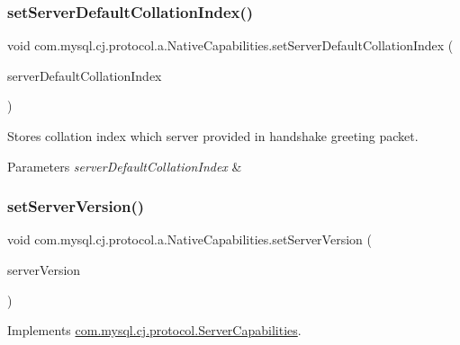\subsubsection{\texorpdfstring{set\+Server\+Default\+Collation\+Index()}{setServerDefaultCollationIndex()}}
{\footnotesize\ttfamily void com.\+mysql.\+cj.\+protocol.\+a.\+Native\+Capabilities.\+set\+Server\+Default\+Collation\+Index (\begin{DoxyParamCaption}\item[{int}]{server\+Default\+Collation\+Index }\end{DoxyParamCaption})}

Stores collation index which server provided in handshake greeting packet.


\begin{DoxyParams}{Parameters}
{\em server\+Default\+Collation\+Index} & \\
\hline
\end{DoxyParams}
\mbox{\label{classcom_1_1mysql_1_1cj_1_1protocol_1_1a_1_1_native_capabilities_a9785f3b62dcfb7fef17a97d74510c5fa}} 
\subsubsection{\texorpdfstring{set\+Server\+Version()}{setServerVersion()}}
{\footnotesize\ttfamily void com.\+mysql.\+cj.\+protocol.\+a.\+Native\+Capabilities.\+set\+Server\+Version (\begin{DoxyParamCaption}\item[{\mbox{\hyperlink{classcom_1_1mysql_1_1cj_1_1_server_version}{Server\+Version}}}]{server\+Version }\end{DoxyParamCaption})}



Implements \mbox{\hyperlink{interfacecom_1_1mysql_1_1cj_1_1protocol_1_1_server_capabilities_a4474ed857120dcbd9148d3b94e2962ac}{com.\+mysql.\+cj.\+protocol.\+Server\+Capabilities}}.

\mbox{\label{classcom_1_1mysql_1_1cj_1_1protocol_1_1a_1_1_native_capabilities_ab2177d5aad98f819db246eaa7bf21069}} 

